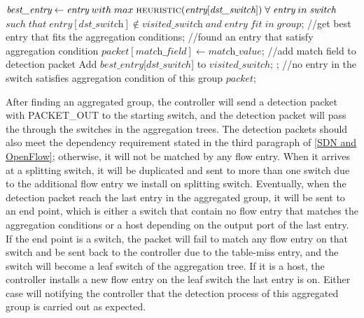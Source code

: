 \begin {tcolorbox}[blanker,float=tbp,
grow to left by=1cm, grow to right by=1cm]
\begin{algorithm}[H]
  \begin{algorithmic}[1]
      \State $\textit{best\_entry} \gets \textit{entry}\;with\;max\; \Call{heuristic}{\textit{entry}[\textit{dst\_switch}]}\;\forall\;\textit{entry}\;in\;\textit{switch}$
      \State $such\;that\;\textit{entry}[\textit{dst\_switch}] \notin \textit{visited\_switch}\;and\;\textit{entry}\;fit\;in\;group$;  //get best entry that fits the aggregation conditions;
        //found an entry that satisfy aggregation condition
        \State $\textit{packet}[\textit{match\_field}] \gets \textit{match\_value}$;  //add match field to detection packet
        \State Add $best\_entry$[$dst\_switch$] to $visited\_switch$;
        \State \Return {};  //no entry in the switch satisfies aggregation condition of this group
      \EndIf
      \State \Return $packet$;
    \EndFunction
  \end{algorithmic}
\end{algorithm}
\end{tcolorbox}

After finding an aggregated group, the controller will send a detection packet with PACKET\_OUT to the starting switch, and the detection packet will pass the through the switches in the aggregation trees. The detection packets should also meet the dependency requirement stated in the third paragraph of \ref{SDN and OpenFlow}; otherwise, it will not be matched by any flow entry. When it arrives at a splitting switch, it will be duplicated and sent to more than one switch due to the additional flow entry we install on splitting switch. Eventually, when the detection packet reach the last entry in the aggregated group, it will be sent to an end point, which is either a switch that contain no flow entry that matches the aggregation conditions or a host depending on the output port of the last entry. If the end point is a switch, the packet will fail to match any flow entry on that switch and be sent back to the controller due to the table-miss entry, and the switch will become a leaf switch of the aggregation tree. If it is a host, the controller installs a new flow entry on the leaf switch the last entry is on. Either case will notifying the controller that the detection process of this aggregated group is carried out as expected.


